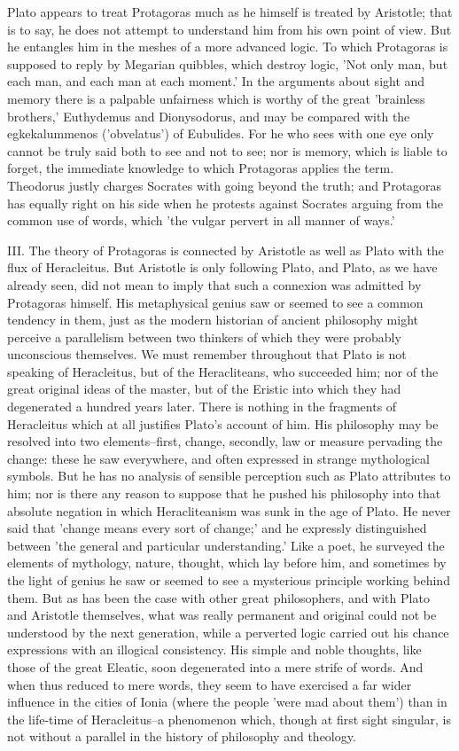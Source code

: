 Plato appears to treat Protagoras much as he himself is treated by
Aristotle; that is to say, he does not attempt to understand him from
his own point of view. But he entangles him in the meshes of a more
advanced logic. To which Protagoras is supposed to reply by Megarian
quibbles, which destroy logic, 'Not only man, but each man, and each
man at each moment.' In the arguments about sight and memory there is a
palpable unfairness which is worthy of the great 'brainless brothers,'
Euthydemus and Dionysodorus, and may be compared with the egkekalummenos
('obvelatus') of Eubulides. For he who sees with one eye only cannot be
truly said both to see and not to see; nor is memory, which is liable
to forget, the immediate knowledge to which Protagoras applies the
term. Theodorus justly charges Socrates with going beyond the truth;
and Protagoras has equally right on his side when he protests against
Socrates arguing from the common use of words, which 'the vulgar pervert
in all manner of ways.'

III. The theory of Protagoras is connected by Aristotle as well as Plato
with the flux of Heracleitus. But Aristotle is only following Plato,
and Plato, as we have already seen, did not mean to imply that such a
connexion was admitted by Protagoras himself. His metaphysical genius
saw or seemed to see a common tendency in them, just as the modern
historian of ancient philosophy might perceive a parallelism between
two thinkers of which they were probably unconscious themselves. We must
remember throughout that Plato is not speaking of Heracleitus, but of
the Heracliteans, who succeeded him; nor of the great original ideas of
the master, but of the Eristic into which they had degenerated a hundred
years later. There is nothing in the fragments of Heracleitus which at
all justifies Plato's account of him. His philosophy may be resolved
into two elements--first, change, secondly, law or measure pervading
the change: these he saw everywhere, and often expressed in strange
mythological symbols. But he has no analysis of sensible perception such
as Plato attributes to him; nor is there any reason to suppose that
he pushed his philosophy into that absolute negation in which
Heracliteanism was sunk in the age of Plato. He never said that 'change
means every sort of change;' and he expressly distinguished between
'the general and particular understanding.' Like a poet, he surveyed
the elements of mythology, nature, thought, which lay before him, and
sometimes by the light of genius he saw or seemed to see a mysterious
principle working behind them. But as has been the case with other great
philosophers, and with Plato and Aristotle themselves, what was really
permanent and original could not be understood by the next generation,
while a perverted logic carried out his chance expressions with an
illogical consistency. His simple and noble thoughts, like those of the
great Eleatic, soon degenerated into a mere strife of words. And when
thus reduced to mere words, they seem to have exercised a far wider
influence in the cities of Ionia (where the people 'were mad about
them') than in the life-time of Heracleitus--a phenomenon which, though
at first sight singular, is not without a parallel in the history of
philosophy and theology.

